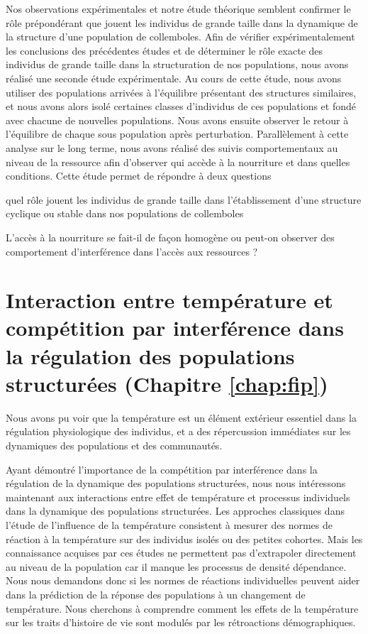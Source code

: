 Nos observations expérimentales et notre étude théorique semblent confirmer le
rôle prépondérant que jouent les individus de grande taille dans la dynamique de
la structure d'une population de collemboles. Afin de vérifier expérimentalement
les conclusions des précédentes études et de déterminer le rôle exacte des
individus de grande taille dans la structuration de nos populations, nous avons
réalisé une seconde étude expérimentale. Au cours de cette étude, nous avons
utiliser des populations arrivées à l'équilibre présentant des structures
similaires, et nous avons alors isolé certaines classes d'individus de ces
populations et fondé avec chacune de nouvelles populations. Nous avons ensuite
observer le retour à l'équilibre de chaque sous population après perturbation.
Parallèlement à cette analyse sur le long terme, nous avons réalisé des suivis
comportementaux au niveau de la ressource afin d'observer qui accède à la
nourriture et dans quelles conditions. Cette étude permet de répondre à deux
questions \begin{enumerate*}[label=(\roman*), before=\unskip{ : }, itemjoin={{ ? }},
itemjoin*={{ ? Et }}] \item quel rôle jouent les individus de grande taille dans
l'établissement d'une structure cyclique ou stable dans nos populations de
collemboles \item L'accès à la nourriture se fait-il de façon homogène ou
peut-on observer des comportement d'interférence dans l'accès aux ressources ?
\end{enumerate*}

\section{Interaction entre température et compétition par interférence dans
la régulation des populations structurées (Chapitre \ref{chap:fip})}

Nous avons pu voir que la température est un élément extérieur essentiel dans la
régulation physiologique des individus, et a des répercussion immédiates sur les
dynamiques des populations et des communautés. 

Ayant démontré l'importance de la compétition par interférence dans la
régulation de la dynamique des populations structurées, nous nous intéressons
maintenant aux interactions entre effet de température et processus individuels
dans la dynamique des populations structurées. Les approches classiques dans
l'étude de l'influence de la température consistent à mesurer des normes de
réaction à la température sur des individus isolés ou des petites cohortes. Mais
les connaissance acquises par ces études ne permettent pas d'extrapoler
directement au niveau de la population car il manque les processus de densité
dépendance. Nous nous demandons donc si les normes de réactions individuelles
peuvent aider dans la prédiction de la réponse des populations à un changement
de température. Nous cherchons à comprendre comment les effets de la température
sur les traits d'histoire de vie sont modulés par les rétroactions
démographiques.

